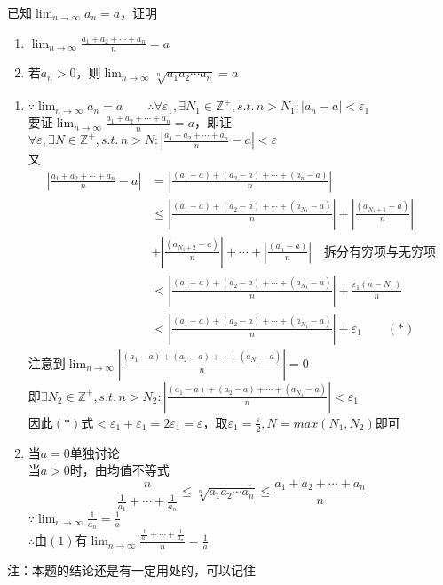 \begin{example}
\label{lim1}
已知$\displaystyle\lim_{n\to\infty}a_n=a$，证明
\begin{enumerate}
	\item $\displaystyle\lim_{n\to\infty}\frac{a_1+a_2+\cdots+a_n}{n}=a$
	\item 若$a_n>0$，则$\displaystyle\lim_{n\to\infty}\sqrt[n]{a_1a_2\cdots a_n}=a$
\end{enumerate}
\end{example}
\begin{analysis}
\begin{enumerate}
\item $\displaystyle\because \lim_{n\to\infty}a_n=a\qquad\therefore\forall\varepsilon_1,\exists N_1\in\mathbb{Z}^+,s.t.\,n>N_1:|a_n-a|<\varepsilon_1$\\
要证$\displaystyle\lim_{n\to\infty}\frac{a_1+a_2+\cdots+a_n}{n}=a$，即证$\displaystyle\forall\varepsilon,\exists N\in\mathbb{Z}^+,s.t.\,n>N:\left|\frac{a_1+a_2+\cdots+a_n}{n}-a\right|<\varepsilon$\\
又
\begin{equation*}
\begin{aligned}
\left|\frac{a_1+a_2+\cdots+a_n}{n}-a\right|& =\left|\frac{(a_1-a)+(a_2-a)+\cdots+(a_n-a)}{n}\right|\\
&\leq \left|\frac{(a_1-a)+(a_2-a)+\cdots+(a_{N_1}-a)}{n}\right|+\left|\frac{(a_{N_1+1}-a)}{n}\right|\\
&+\left|\frac{(a_{N_1+2}-a)}{n}\right|+\cdots+\left|\frac{(a_{n}-a)}{n}\right|\quad\mbox{拆分有穷项与无穷项}\\
&< \left|\frac{(a_1-a)+(a_2-a)+\cdots+(a_{N_1}-a)}{n}\right|+\frac{\varepsilon_1(n-N_1)}{n}\\
&< \left|\frac{(a_1-a)+(a_2-a)+\cdots+(a_{N_1}-a)}{n}\right|+\varepsilon_1\qquad(*)
\end{aligned}
\end{equation*}
注意到$\displaystyle\lim_{n\to\infty}\left|\frac{(a_1-a)+(a_2-a)+\cdots+(a_{N_1}-a)}{n}\right|=0$\\
即$\displaystyle\exists N_2\in\mathbb{Z}^+,s.t.\,n>N_2:\left|\frac{(a_1-a)+(a_2-a)+\cdots+(a_{N_1}-a)}{n}\right|<\varepsilon_1$\\
因此$(*)$式$<\varepsilon_1+\varepsilon_1=2\varepsilon_1=\varepsilon$，取$\varepsilon_1=\frac{\varepsilon}{2},N=max(N_1,N_2)$即可
\item 当$a=0$单独讨论\\
当$a>0$时，由均值不等式
\[\frac{n}{\frac{1}{a_1}+\cdots+\frac{1}{a_n}}\leq\sqrt[n]{a_1a_2\cdots a_n}\leq\frac{a_1+a_2+\cdots+a_n}{n}\]
$\displaystyle\because\lim_{n\to\infty}\frac{1}{a_n}=\frac{1}{a}$\\
$\displaystyle\therefore\text{由}(1)\text{有}\lim_{n\to\infty}\frac{\frac{1}{a_1}+\cdots+\frac{1}{a_n}}{n}=\frac{1}{a}$
\end{enumerate}
注：本题的结论还是有一定用处的，可以记住
\end{analysis}
